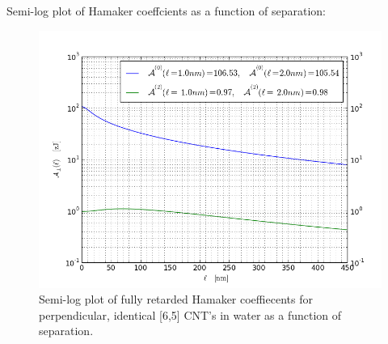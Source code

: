 \documentclass[a4paper]{article}
\begin{document}
\begin{center}
\hskip 73pt
Semi-log plot of Hamaker coeffcients as a function of separation:
\begin{figure}[t!]
\begin{center}
\includegraphics[width=1.2\textwidth]{plots/140322_65w65_HCs_semilog_perpendicular_ret.png}
\hskip 43pt
\caption{Semi-log plot of fully retarded Hamaker coeffiecents for perpendicular, identical [6,5] CNT's in water
as a function of separation.} 
\label{eiz65}
\end{center}
\end{figure} 
\end{center}

\end{document}
